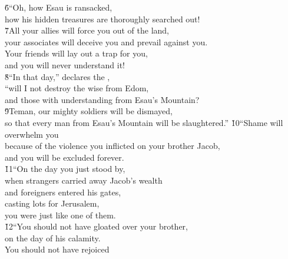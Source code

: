 \begin{poetry}
\poeml \v{6}``Oh, how Esau is ransacked, \\
\poemll    how his hidden treasures are thoroughly searched out! \\
\poeml \v{7}All your allies will force you out of the land, \\
\poemll    your associates will deceive you and prevail against you. \\
\poeml Your friends will lay out a trap for you, \\
\poemll    and you will never understand it! \\
\poeml \v{8}``In that day,'' declares the , \\
\poemll    ``will I not destroy the wise from Edom, \\
\poemll    and those with understanding from Esau's Mountain? \\
\poeml \v{9}Teman, our mighty soldiers will be dismayed, \\
\poemll    so that every man from Esau's Mountain will be slaughtered.''
\poeml \v{10}``Shame will overwhelm you \\
\poemll    because of the violence you inflicted on your brother Jacob, \\
\poeml and you will be excluded forever. \\
\poeml \v{11}``On the day you just stood by, \\
\poeml when strangers carried away Jacob's wealth \\
\poeml and foreigners entered his gates, \\
\poemll    casting lots for Jerusalem, \\
\poeml you were just like one of them. \\
\poeml \v{12}``You should not have gloated over your brother, \\
\poemll    on the day of his calamity. \\
\poeml You should not have rejoiced \\

\end{poetry}
